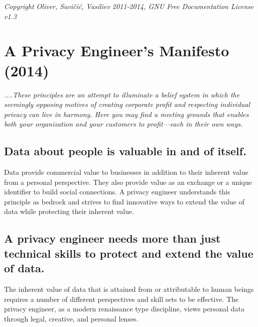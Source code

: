\documentclass[letterpaper,12pt,english]{sphinxmanual}
\begin{document}
\emph{Copyright Oliver, Savičić, Vasiliev 2011-2014, GNU Free Documentation License v1.3}


\chapter{A Privacy Engineer’s Manifesto \protect\footnotemark[1] (2014)}
\label{privacy::doc}\label{privacy:a-privacy-engineers-manifesto-1-2014}\label{privacy:index-0}
\emph{....These principles are an attempt to illuminate a belief system in which the seemingly opposing motives of creating corporate profit and respecting individual privacy can live in harmony. Here you may find a meeting grounds that enables both your organization and your customers to profit—each in their own ways.}


\section{Data about people is valuable in and of itself.}
\label{privacy:data-about-people-is-valuable-in-and-of-itself}
Data provide commercial value to businesses in addition to their inherent value from a personal perspective. They also provide value as an exchange or a unique identifier to build social connections. A privacy engineer understands this principle as bedrock and strives to find innovative ways to extend the value of data while protecting their inherent value.


\section{A privacy engineer needs more than just technical skills to protect and extend the value of data.}
\label{privacy:a-privacy-engineer-needs-more-than-just-technical-skills-to-protect-and-extend-the-value-of-data}
The inherent value of data that is attained from or attributable to human beings requires a number of different perspectives and skill sets to be effective. The privacy engineer, as a modern renaissance type discipline, views personal data through legal, creative, and personal lenses.
\end{document}
